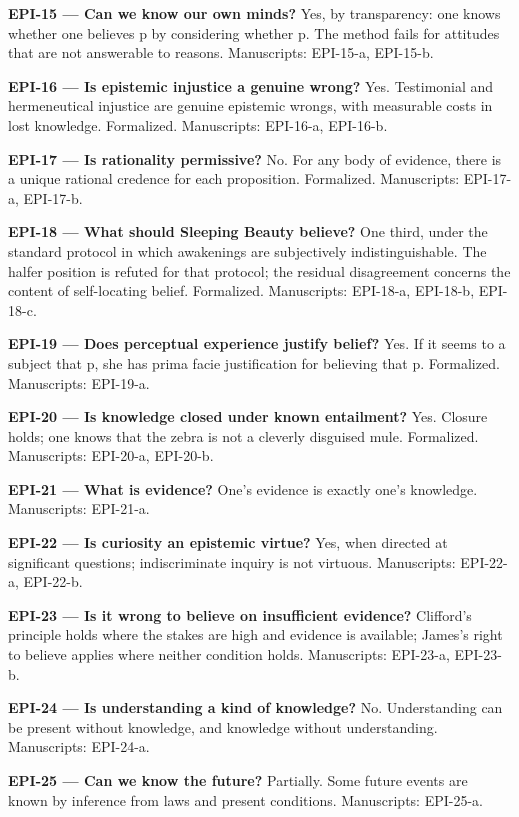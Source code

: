 \documentclass[10pt]{article}
\begin{document}
\textbf{EPI-15 --- Can we know our own minds?} Yes, by transparency: one knows whether one believes p by considering whether p. The method fails for attitudes that are not answerable to reasons. Manuscripts: EPI-15-a, EPI-15-b.

\textbf{EPI-16 --- Is epistemic injustice a genuine wrong?} Yes. Testimonial and hermeneutical injustice are genuine epistemic wrongs, with measurable costs in lost knowledge. Formalized. Manuscripts: EPI-16-a, EPI-16-b.

\textbf{EPI-17 --- Is rationality permissive?} No. For any body of evidence, there is a unique rational credence for each proposition. Formalized. Manuscripts: EPI-17-a, EPI-17-b.

\textbf{EPI-18 --- What should Sleeping Beauty believe?} One third, under the standard protocol in which awakenings are subjectively indistinguishable. The halfer position is refuted for that protocol; the residual disagreement concerns the content of self-locating belief. Formalized. Manuscripts: EPI-18-a, EPI-18-b, EPI-18-c.

\textbf{EPI-19 --- Does perceptual experience justify belief?} Yes. If it seems to a subject that p, she has prima facie justification for believing that p. Formalized. Manuscripts: EPI-19-a.

\textbf{EPI-20 --- Is knowledge closed under known entailment?} Yes. Closure holds; one knows that the zebra is not a cleverly disguised mule. Formalized. Manuscripts: EPI-20-a, EPI-20-b.

\textbf{EPI-21 --- What is evidence?} One's evidence is exactly one's knowledge. Manuscripts: EPI-21-a.

\textbf{EPI-22 --- Is curiosity an epistemic virtue?} Yes, when directed at significant questions; indiscriminate inquiry is not virtuous. Manuscripts: EPI-22-a, EPI-22-b.

\textbf{EPI-23 --- Is it wrong to believe on insufficient evidence?} Clifford's principle holds where the stakes are high and evidence is available; James's right to believe applies where neither condition holds. Manuscripts: EPI-23-a, EPI-23-b.

\textbf{EPI-24 --- Is understanding a kind of knowledge?} No. Understanding can be present without knowledge, and knowledge without understanding. Manuscripts: EPI-24-a.

\textbf{EPI-25 --- Can we know the future?} Partially. Some future events are known by inference from laws and present conditions. Manuscripts: EPI-25-a.
\end{document}
